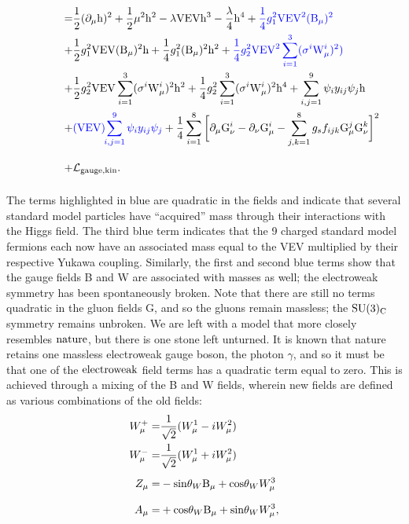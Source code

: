 \begin{align}
\hphantom{\Lag_{\rm SM}'=}=&\frac{1}{2}(\partial_\mu {\rm h})^2 
+ \frac{1}{2}\mu^2 {\rm h}^{2}
- \lambda{\rm VEV}{\rm h}^{3} 
- \frac{\lambda}{4}{\rm h}^{4}
+  {\color{blue} \frac{1}{4}g_{1}^{2}{\rm VEV}^2({\rm B}_{\mu})^2}
\nonumber \\\vp
+ &\frac{1}{2}g_{1}^{2}{\rm VEV}({\rm B}_{\mu})^2{\rm h}
+ \frac{1}{4}g_{1}^{2}({\rm B}_{\mu})^2{\rm h}^2 
+ {\color{blue}\frac{1}{4}g_{2}^2{\rm VEV}^2\sum_{i=1}^{3}(\sigma^{i} {\rm W}^{i}_{\mu})^2)}
\nonumber \\\vp
+ & \frac{1}{2}g_{2}^2 {\rm VEV}\sum_{i=1}^{3}(\sigma^{i} {\rm W}^{i}_{\mu})^2{\rm h}^2
+ \frac{1}{4}g_{2}^2\sum_{i=1}^{3}(\sigma^{i} {\rm W}^{i}_{\mu})^2{\rm h}^4
+ \sum_{i,j=1}^{9}\psi_i y_{ij} \psi_{j}{\rm h}
\nonumber \\\vp 
+ & {\color{blue}({\rm VEV})\hspace{-.1cm}\sum_{i,j=1}^{9}\psi_i y_{ij} \psi_{j}}
+ \frac{1}{4}\sum_{i=1}^{8}\bigg[\partial_\mu {\rm G}^{i}_\nu - \partial_\nu {\rm G}^{i}_\mu - \sum_{j,k=1}^{8}g_s f_{ijk} {\rm G}^{j}_{\mu}{\rm G}^{k}_{\nu}\bigg]^2 
\nonumber \\\vp 
+ &\Lag_{\rm gauge, kin}.
\end{align}
The terms highlighted in blue are quadratic in the fields and indicate that several standard model particles have ``acquired'' mass through their interactions with the Higgs field. The third blue term indicates that the 9 charged standard model fermions each now have an associated mass equal to the VEV multiplied by their respective Yukawa coupling. Similarly, the first and second blue terms show that the gauge fields B and W are associated with masses as well; the electroweak symmetry has been spontaneously broken. Note that there are still no terms quadratic in the gluon fields G, and so the gluons remain massless; the $\rm SU(3)_{C}$ symmetry remains unbroken. We are left with a model that more closely resembles $\rm nature$, but there is one stone left unturned. It is known that nature retains one massless electroweak gauge boson, the photon $\gamma$, and so it must be that one of the $\rm electroweak$ field terms has a quadratic term equal to zero. This is achieved through a mixing of the B and W fields, wherein new fields are defined as various combinations of the old fields:
\begin{align}
\vps W_{\mu}^{+} =& \frac{1}{\sqrt{2}}(W_{\mu}^1 - i W_{\mu}^2)\\
\vps W_{\mu}^{-} =& \frac{1}{\sqrt{2}}(W_{\mu}^1 + i W_{\mu}^2)\\
\vps Z_{\mu} =& -{\rm sin}\theta_{W}{\rm B}_\mu+{\rm cos}\theta_{W}W_{\mu}^3\\
\vps A_{\mu} =&+{\rm cos}\theta_{W}{\rm B}_\mu+{\rm sin}\theta_{W}W_{\mu}^3,
\end{align}
